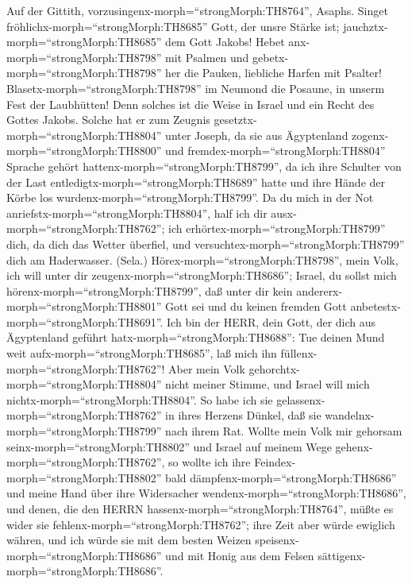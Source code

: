 Auf der Gittith, vorzusingenx-morph=``strongMorph:TH8764'',
Asaphs. Singet fröhlichx-morph=``strongMorph:TH8685'' Gott, der unsre
Stärke ist; jauchztx-morph=``strongMorph:TH8685'' dem Gott Jakobs!
 Hebet anx-morph=``strongMorph:TH8798'' mit Psalmen und
gebetx-morph=``strongMorph:TH8798'' her die Pauken, liebliche Harfen mit
Psalter!  Blasetx-morph=``strongMorph:TH8798'' im Neumond
die Posaune, in unserm Fest der Laubhütten!  Denn solches
ist die Weise in Israel und ein Recht des Gottes Jakobs. 
Solche hat er zum Zeugnis gesetztx-morph=``strongMorph:TH8804'' unter
Joseph, da sie aus Ägyptenland zogenx-morph=``strongMorph:TH8800'' und
fremdex-morph=``strongMorph:TH8804'' Sprache gehört
hattenx-morph=``strongMorph:TH8799'',  da ich ihre Schulter
von der Last entledigtx-morph=``strongMorph:TH8689'' hatte und ihre
Hände der Körbe los wurdenx-morph=``strongMorph:TH8799''. 
Da du mich in der Not anriefstx-morph=``strongMorph:TH8804'', half ich
dir ausx-morph=``strongMorph:TH8762''; ich
erhörtex-morph=``strongMorph:TH8799'' dich, da dich das Wetter überfiel,
und versuchtex-morph=``strongMorph:TH8799'' dich am Haderwasser. (Sela.)
 Hörex-morph=``strongMorph:TH8798'', mein Volk, ich will
unter dir zeugenx-morph=``strongMorph:TH8686''; Israel, du sollst mich
hörenx-morph=``strongMorph:TH8799'',  daß unter dir kein
andererx-morph=``strongMorph:TH8801'' Gott sei und du keinen fremden
Gott anbetestx-morph=``strongMorph:TH8691''.  Ich bin der
HERR, dein Gott, der dich aus Ägyptenland geführt
hatx-morph=``strongMorph:TH8688'': Tue deinen Mund weit
aufx-morph=``strongMorph:TH8685'', laß mich ihn
füllenx-morph=``strongMorph:TH8762''!  Aber mein Volk
gehorchtx-morph=``strongMorph:TH8804'' nicht meiner Stimme, und Israel
will mich nichtx-morph=``strongMorph:TH8804''.  So habe ich
sie gelassenx-morph=``strongMorph:TH8762'' in ihres Herzens Dünkel, daß
sie wandelnx-morph=``strongMorph:TH8799'' nach ihrem Rat. 
Wollte mein Volk mir gehorsam seinx-morph=``strongMorph:TH8802'' und
Israel auf meinem Wege gehenx-morph=``strongMorph:TH8762'',
 so wollte ich ihre Feindex-morph=``strongMorph:TH8802''
bald dämpfenx-morph=``strongMorph:TH8686'' und meine Hand über ihre
Widersacher wendenx-morph=``strongMorph:TH8686'',  und
denen, die den HERRN hassenx-morph=``strongMorph:TH8764'', müßte es
wider sie fehlenx-morph=``strongMorph:TH8762''; ihre Zeit aber würde
ewiglich währen,  und ich würde sie mit dem besten Weizen
speisenx-morph=``strongMorph:TH8686'' und mit Honig aus dem Felsen
sättigenx-morph=``strongMorph:TH8686''.


